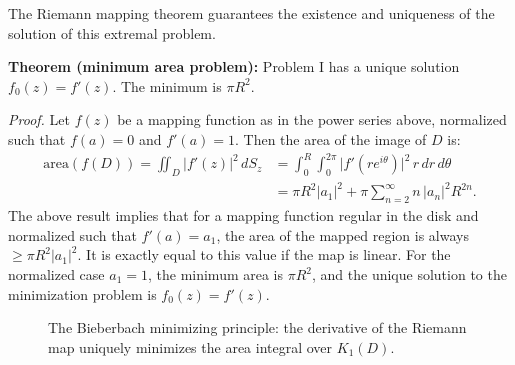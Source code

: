 \documentclass[12pt,a4paper]{article}
\begin{document}
The Riemann mapping theorem guarantees the existence and uniqueness of the solution of this extremal problem.

\begin{theorembox}
\textbf{Theorem (minimum area problem):} Problem I has a unique solution \(f_0(z) = f'(z)\). The minimum is \(\pi R^2\).
\end{theorembox}

\textit{Proof.} Let \(f(z)\) be a mapping function as in the power series above, normalized such that \(f(a) = 0\) and \(f'(a) = 1\). Then the area of the image of \(D\) is:
\begin{align*}
\mathrm{area}(f(D)) = \iint_{D} |f'(z)|^2 \, dS_z
&= \int_0^R\!\int_0^{2\pi} \bigl|f'(re^{i\theta})\bigr|^2\, r\,dr\,d\theta \\
&= \pi R^2|a_1|^2 + \pi\sum_{n=2}^{\infty} n\,|a_n|^2 R^{2n}.
\end{align*}
The above result implies that for a mapping function regular in the disk and normalized such that \(f'(a) = a_1\), the area of the mapped region is always \(\ge \pi R^2|a_1|^2\). It is exactly equal to this value if the map is linear. For the normalized case \(a_1 = 1\), the minimum area is \(\pi R^2\), and the unique solution to the minimization problem is \(f_0(z) = f'(z)\).

\begin{figure}[H]
\centering
{}
\caption{The Bieberbach minimizing principle: the derivative of the Riemann map uniquely minimizes the area integral over \(K_1(D)\).}
\end{figure}
\end{document}
